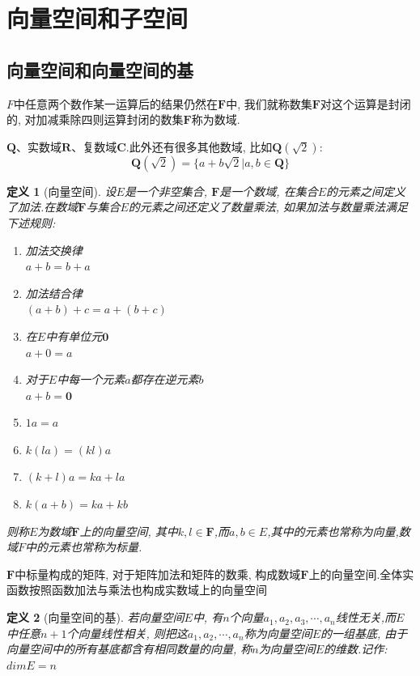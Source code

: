 \documentclass[a4paper,11pt]{book}
\newtheorem{definition}{\hspace{2em}定义}[section]
\begin{document}
\section{向量空间和子空间}
\subsection*{向量空间和向量空间的基}
$F$中任意两个数作某一运算后的结果仍然在$\mathbf{F}$中, 我们就称数集$\mathbf{F}$对这个运算是封闭的, 对加减乘除四则运算封闭的数集$\mathbf{F}$称为数域.

$\mathbf{Q}$、实数域$\mathbf{R}$、复数域$\mathbf{C}$.此外还有很多其他数域, 比如$\mathbf{Q}(\sqrt{2})$:
\begin{equation*}
  \mathbf{Q}(\sqrt{2})=\{a+b\sqrt{2}|a,b\in\mathbf{Q}\}
\end{equation*}
\begin{definition}[向量空间]
  设$E$是一个非空集合, $\mathbf{F}$是一个数域, 在集合$E$的元素之间定义了加法.在数域$\mathbf{F}$与集合$E$的元素之间还定义了数量乘法, 如果加法与数量乘法满足下述规则:
  \begin{enumerate}[(1)]
    \item 加法交换律\\$a+b=b+a$
    \item 加法结合律\\$(a+b)+c=a+(b+c)$
    \item 在$E$中有单位元$\mathbf{0}$\\$a+0=a$
    \item 对于$E$中每一个元素$a$都存在逆元素$b$\\$a+b=\mathbf{0}$
    \item $1a=a$
    \item $k(la)=(kl)a$
    \item $(k+l)a=ka+la$
    \item $k(a+b)=ka+kb$
  \end{enumerate}
  则称$E$为数域$\mathbf{F}$上的向量空间, 其中$k,l\in \mathbf{F}$,而$a,b\in E$,其中的元素也常称为向量,数域$F$中的元素也常称为标量.
\end{definition}
$\mathbf{F}$中标量构成的矩阵, 对于矩阵加法和矩阵的数乘, 构成数域$\mathbf{F}$上的向量空间.全体实函数按照函数加法与乘法也构成实数域上的向量空间
\begin{definition}[向量空间的基]
  若向量空间$E$中, 有$n$个向量$a_1,a_2,a_3,\cdots,a_n$线性无关,而$E$中任意$n+1$个向量线性相关, 则把这$a_1,a_2,\cdots,a_n$称为向量空间$E$的一组基底, 由于向量空间中的所有基底都含有相同数量的向量, 称$n$为向量空间$E$的维数.记作:$dimE=n$
\end{definition}
\end{document}
